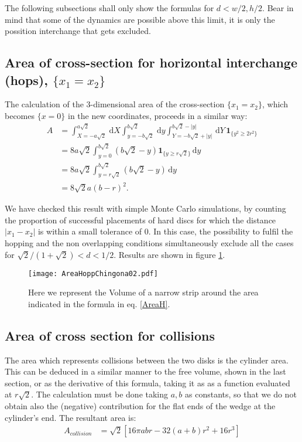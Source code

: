 \documentclass[a4paper,10pt, jcp, aps, preprint]{revtex4-1}
\newcommand{\rd}{\, \mathrm{d}}
\newcommand{\indicator}[1]{\mathbf{1}_{ \{   #1 \} } }
\begin{document}
The following subsections shall only show the formulas for $d<w/2, h/2$.
Bear in mind that some of the dynamics are possible above this limit,
it is only the possition interchange that gets excluded. 

\subsection{Area of cross-section for horizontal interchange (hops), 
$\{x_1 = x_2\}$}

The calculation of the $3$-dimensional area of the cross-section 
$\{x_1 = x_2\}$, which becomes 
$\{ x=0 \}$ in the new coordinates, proceeds in a similar way:
\begin{align}
 A &= \int_{X=-a \sqrt{2} }^{a \sqrt{2}}  \rd X
 \int_{y=-b \sqrt{2}}^{b \sqrt{2}} \rd y
\int_{Y=-b \sqrt{2} + |y| }^{b \sqrt{2}-|y|}  \rd Y
\, \indicator{y^2 \ge 2r^2 } \\
&= 8 a \sqrt{2} \int_{y=0}^{b \sqrt{2}} 
\left( b \sqrt{2} - y \right)  \indicator{y \ge r \sqrt{2} }  \rd y \\
&= 8 a \sqrt{2} \int_{y= r\sqrt{2}}^{b \sqrt{2}}  \left( b \sqrt{2} - y \right)  \rd y \\
&= 8 \sqrt{2} a ( b - r )^2. \label{AreaH}
\end{align}

We have checked this result with simple Monte Carlo simulations, 
by counting the proportion of successful placements of hard discs for which the distance 
$|x_1 - x_2|$ is within a small tolerance of $0$. In this case, the possibility to fulfil
the hopping and the non overlapping conditions simultaneously exclude 
all the cases for $\sqrt{2}/(1+\sqrt{2}) <d<1/2$. Results are shown in figure \ref{AreaHopp01}.

\begin{figure}[h]
\centering
\texttt{[image: AreaHoppChingona02.pdf]}
\caption{Here we represent the Volume of a narrow strip around the area
  indicated in the formula in eq. \ref{AreaH}.} 
\label{AreaHopp01}
\end{figure}


\subsection{Area of cross section for collisions}

The area which represents collisions between the two disks is the cylinder area. 
This can be deduced in a similar manner to the free volume, shown in the last
section, or as the derivative of this formula, taking it as as a function evaluated at 
$r\sqrt{2}$. The calculation must be done taking $a,b$ as constants, so that
we do not obtain also the (negative) contribution for the flat ends of
the wedge at the cylinder's end. The resultant area is:
\begin{align}\label{AreaChoque}
A_{collision} & =\sqrt{2}[  
16\pi a b r -32 (a+b)r^2 +16 r^3 ] 
\end{align}
\end{document}
